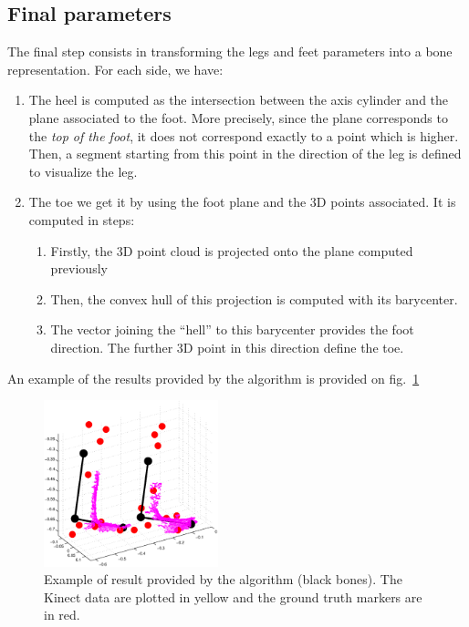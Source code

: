 \documentclass[letterpaper, 10 pt, conference]{ieeeconf}
\begin{document}
\subsection{Final parameters}
The final step consists in transforming the legs and feet parameters into a bone representation. For each side, we have:
\begin{enumerate}
	\item The heel is computed as the intersection between the axis cylinder and the plane associated to the foot. More precisely, since the plane corresponds to the \emph{top of the foot}, it does not correspond exactly to a point which is higher. Then, a segment starting from this point in the direction of the leg is defined to visualize the leg.
	\item The toe we get it by using the foot plane and the 3D points associated. It is computed in steps:
	\begin{enumerate}
		\item Firstly, the 3D point cloud is projected onto the plane computed previously
		\item Then, the convex hull of this projection is computed with its barycenter.
		\item The vector joining the ``hell'' to this barycenter provides the foot direction. The further 3D point in this direction define the toe.
	\end{enumerate}
\end{enumerate}
An example of the results provided by the algorithm is provided on fig.~\ref{fig:exampleBones}

\begin{figure}
	\centering
	\includegraphics[width=0.45\textwidth]{images/exampleBones}
	\caption{Example of result provided by the algorithm (black bones). The Kinect data are plotted in yellow and the ground truth markers are in red.}
	\label{fig:exampleBones}
\end{figure}
\end{document}
